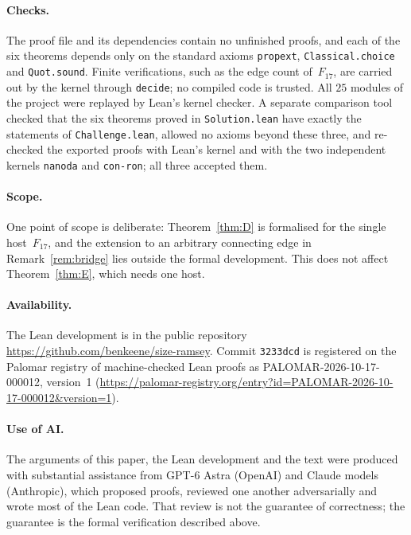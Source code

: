 \documentclass[11pt,letterpaper]{article}
\numberwithin{equation}{section}
\theoremstyle{plain}
\theoremstyle{definition}
\theoremstyle{remark}
\begin{document}
\paragraph{Checks.} The proof file and its dependencies contain no unfinished proofs, and each of the six theorems depends only on the standard axioms \texttt{propext}, \texttt{Classical.choice} and \texttt{Quot.sound}. Finite verifications, such as the edge count of~$F_{17}$, are carried out by the kernel through \texttt{decide}; no compiled code is trusted. All $25$ modules of the project were replayed by Lean's kernel checker. A separate comparison tool checked that the six theorems proved in \texttt{Solution.lean} have exactly the statements of \texttt{Challenge.lean}, allowed no axioms beyond these three, and re-checked the exported proofs with Lean's kernel and with the two independent kernels \texttt{nanoda} and \texttt{con-ron}; all three accepted them.

\paragraph{Scope.} One point of scope is deliberate: Theorem~\ref{thm:D} is formalised for the single host~$F_{17}$, and the extension to an arbitrary connecting edge in Remark~\ref{rem:bridge} lies outside the formal development. This does not affect Theorem~\ref{thm:E}, which needs one host.

\paragraph{Availability.} The Lean development is in the public repository \url{https://github.com/benkeene/size-ramsey}. Commit \texttt{3233dcd} is registered on the Palomar registry of machine-checked Lean proofs as PALOMAR-2026-10-17-000012, version~1 (\url{https://palomar-registry.org/entry?id=PALOMAR-2026-10-17-000012&version=1}).

\paragraph{Use of AI.} The arguments of this paper, the Lean development and the text were produced with substantial assistance from GPT-6 Astra (OpenAI) and Claude models (Anthropic), which proposed proofs, reviewed one another adversarially and wrote most of the Lean code. That review is not the guarantee of correctness; the guarantee is the formal verification described above.




\end{document}
